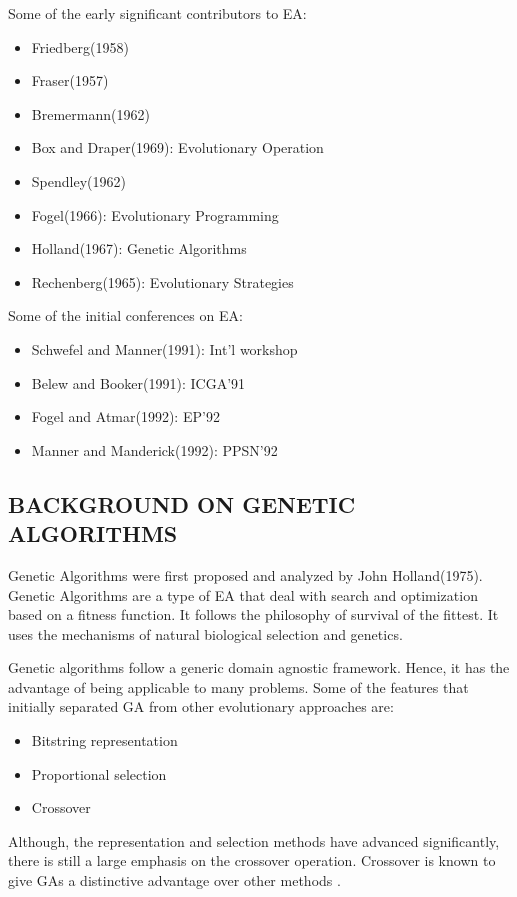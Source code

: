 \documentclass[12pt,a4paper]{article}
\begin{document}
	Some of the early significant contributors to EA:
	\begin{itemize}
	\item Friedberg(1958)
	\item Fraser(1957)
	\item Bremermann(1962)
	\item Box and Draper(1969): Evolutionary Operation
	\item Spendley(1962)
	\item Fogel(1966): Evolutionary Programming
	\item Holland(1967): Genetic Algorithms
	\item Rechenberg(1965): Evolutionary Strategies
	\end{itemize}
	
	Some of the initial conferences on EA:
	\begin{itemize}
	\item Schwefel and Manner(1991): Int'l workshop
	\item Belew and Booker(1991): ICGA'91
	\item Fogel and Atmar(1992): EP'92
	\item Manner and Manderick(1992): PPSN'92
	\end{itemize}
	
	\subsection{BACKGROUND ON GENETIC ALGORITHMS}
	Genetic Algorithms were first proposed and analyzed by John Holland(1975). Genetic Algorithms are a type of EA that deal with search and optimization based on a fitness function. It follows the philosophy of survival of the fittest. It uses the mechanisms of natural biological selection and genetics. \par
	Genetic algorithms follow a generic domain agnostic framework. Hence, it has the advantage of being applicable to many problems. Some of the features that initially separated GA from other evolutionary approaches are:
	\begin{itemize}	
	\item Bitstring representation
	\item Proportional selection
	\item Crossover
	\end{itemize}
	Although, the representation and selection methods have advanced significantly, there is still a large emphasis on the crossover operation. Crossover is known to give GAs a distinctive advantage over other methods \cite{handbook}. \par
	
\end{document}
